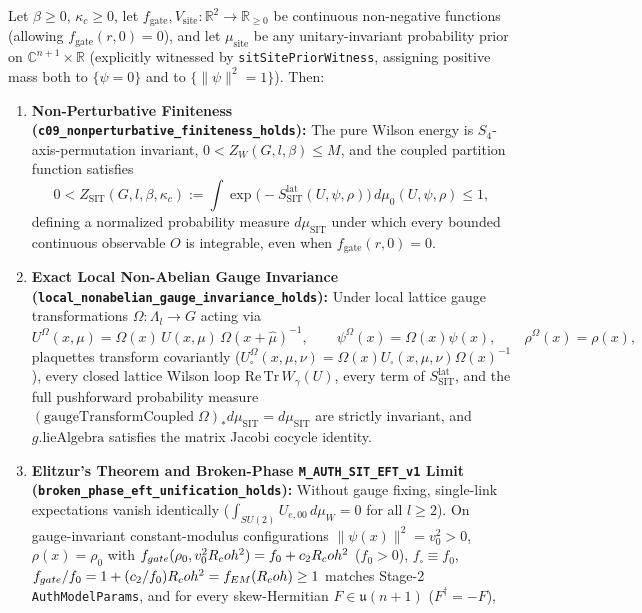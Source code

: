 \begin{theorem}
\label{thm:stage4_targets_1_to_3}
Let $\beta \ge 0$, $\kappa_c \ge 0$, let $f_{\mathrm{gate}}, V_{\mathrm{site}} : \mathbb{R}^2 \to \mathbb{R}_{\ge 0}$ be continuous non-negative functions (allowing $f_{\mathrm{gate}}(r,0) = 0$), and let $\mu_{\mathrm{site}}$ be any unitary-invariant probability prior on $\mathbb{C}^{n+1}\times\mathbb{R}$ (explicitly witnessed by \texttt{sitSitePriorWitness}, assigning positive mass both to $\{\psi = 0\}$ and to $\{\|\psi\|^2 = 1\}$). Then:
\begin{enumerate}[leftmargin=2em]
  \item \textbf{Non-Perturbative Finiteness (\texttt{c09\_\allowbreak{}nonperturbative\_\allowbreak{}finiteness\_\allowbreak{}holds}):} The pure Wilson energy is $S_4$-axis-permutation invariant, $0 < Z_W(G,l,\beta) \le M$, and the coupled partition function satisfies
  \begin{equation}
  0 < Z_{\mathrm{SIT}}(G,l,\beta,\kappa_c) := \int \exp\bigl(-S_{\mathrm{SIT}}^{\mathrm{lat}}(U,\psi,\rho)\bigr)\,d\mu_0(U,\psi,\rho) \le 1,
  \end{equation}
  defining a normalized probability measure $d\mu_{\mathrm{SIT}}$ under which every bounded continuous observable $O$ is integrable, even when $f_{\mathrm{gate}}(r,0) = 0$.
  \item \textbf{Exact Local Non-Abelian Gauge Invariance (\texttt{local\_\allowbreak{}nonabelian\_\allowbreak{}gauge\_\allowbreak{}invariance\_\allowbreak{}holds}):} Under local lattice gauge transformations $\Omega : \Lambda_l \to G$ acting via
  \[
  U^\Omega(x,\mu) = \Omega(x)\,U(x,\mu)\,\Omega(x+\hat{\mu})^{-1}, \qquad
  \psi^\Omega(x) = \Omega(x)\psi(x), \qquad
  \rho^\Omega(x) = \rho(x),
  \]
  plaquettes transform covariantly ($U_\square^\Omega(x,\mu,\nu) = \Omega(x)U_\square(x,\mu,\nu)\Omega(x)^{-1}$), every closed lattice Wilson loop $\mathrm{Re}\,\mathrm{Tr}\,W_\gamma(U)$, every term of $S_{\mathrm{SIT}}^{\mathrm{lat}}$, and the full pushforward probability measure $(\mathrm{gaugeTransformCoupled}\;\Omega)_* d\mu_{\mathrm{SIT}} = d\mu_{\mathrm{SIT}}$ are strictly invariant, and $g.\mathrm{lieAlgebra}$ satisfies the matrix Jacobi cocycle identity.
  \item \textbf{Elitzur's Theorem and Broken-Phase \texttt{M\_AUTH\_SIT\_EFT\_v1} Limit (\texttt{broken\_\allowbreak{}phase\_\allowbreak{}eft\_\allowbreak{}unification\_\allowbreak{}holds}):} Without gauge fixing, single-link expectations vanish identically ($\int_{SU(2)} U_{e,00}\,d\mu_W = 0$ for all $l \ge 2$). On gauge-invariant constant-modulus configurations $\|\psi(x)\|^2 = v_0^2 > 0$, $\rho(x) = \rho_0$ with $f_{gate}(\rho_0, v_0^2R_coh^2) = f_0 + c_2R_coh^2$ ($f_0 > 0$), $f_\square \equiv f_0$, $f_{gate}/f_0 = 1 + (c_2/f_0)R_coh^2 = f_{EM}(R_coh) \ge 1$ matches Stage-2 \texttt{AuthModelParams}, and for every skew-Hermitian $F \in \mathfrak{u}(n+1)$ ($F^\dagger = -F$),

\end{enumerate}
\end{theorem}
